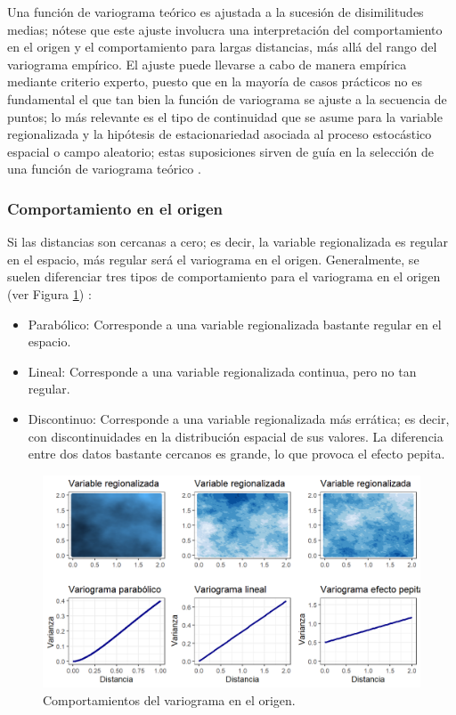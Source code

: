 \documentclass[
]{book}
\begin{document}
Una función de variograma teórico es ajustada a la sucesión de disimilitudes medias; nótese que este ajuste involucra una interpretación del comportamiento en el origen y el comportamiento para largas distancias, más allá del rango del variograma empírico. El ajuste puede llevarse a cabo de manera empírica mediante criterio experto, puesto que en la mayoría de casos prácticos no es fundamental el que tan bien la función de variograma se ajuste a la secuencia de puntos; lo más relevante es el tipo de continuidad que se asume para la variable regionalizada y la hipótesis de estacionariedad asociada al proceso estocástico espacial o campo aleatorio; estas suposiciones sirven de guía en la selección de una función de variograma teórico \citep{hans}.

\hypertarget{comportamiento-en-el-origen}{%
\subsubsection*{Comportamiento en el origen}\label{comportamiento-en-el-origen}}

Si las distancias son cercanas a cero; es decir, la variable regionalizada es regular en el espacio, más regular será el variograma en el origen. Generalmente, se suelen diferenciar tres tipos de comportamiento para el variograma en el origen (ver Figura \ref{fig:varcomp}) \citep{emery}:

\begin{itemize}
\item
  Parabólico: Corresponde a una variable regionalizada bastante regular en el espacio.
\item
  Lineal: Corresponde a una variable regionalizada continua, pero no tan regular.
\item
  Discontinuo: Corresponde a una variable regionalizada más errática; es decir, con discontinuidades en la distribución espacial de sus valores. La diferencia entre dos datos bastante cercanos es grande, lo que provoca el efecto pepita.
\end{itemize}

\begin{figure}
\includegraphics[width=17.78in]{figuras/otros/var_comp} \caption{Comportamientos del variograma en el origen.}\label{fig:varcomp}
\end{figure}
\end{document}
